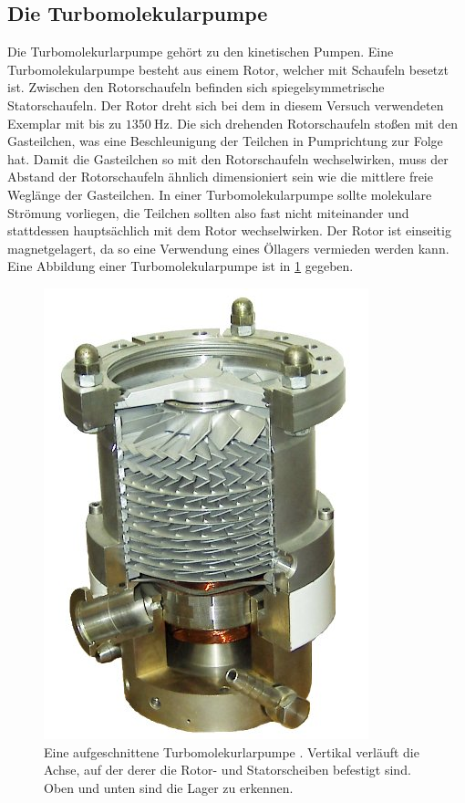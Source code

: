 \subsection{Die Turbomolekularpumpe}
Die Turbomolekurlarpumpe gehört zu den kinetischen Pumpen. Eine Turbomolekularpumpe besteht
aus einem Rotor, welcher mit Schaufeln besetzt ist. Zwischen den Rotorschaufeln befinden sich
spiegelsymmetrische Statorschaufeln. Der Rotor dreht sich bei dem in diesem Versuch verwendeten
Exemplar mit bis zu $\SI{1350}{\hertz}$. Die sich drehenden Rotorschaufeln stoßen mit den Gasteilchen,
was eine Beschleunigung der Teilchen in Pumprichtung zur Folge hat. Damit die Gasteilchen so mit den Rotorschaufeln wechselwirken,
muss der Abstand der Rotorschaufeln ähnlich dimensioniert sein wie die mittlere freie Weglänge der
Gasteilchen. In einer Turbomolekularpumpe sollte molekulare Strömung vorliegen, die Teilchen
sollten also fast nicht miteinander und stattdessen hauptsächlich mit dem Rotor wechselwirken.
Der Rotor ist einseitig magnetgelagert, da so eine Verwendung eines Öllagers vermieden werden kann.
Eine Abbildung einer Turbomolekularpumpe ist in \ref{fig:turbomolekular} gegeben.
\begin{figure}
 \centering
 \caption{Eine aufgeschnittene Turbomolekurlarpumpe \cite{turbopumpenbild}. Vertikal verläuft die Achse, auf der derer die Rotor- und Statorscheiben
 befestigt sind. Oben und unten sind die Lager zu erkennen.}
 \label{fig:turbomolekular}
 \includegraphics[scale=0.3]{pictures/Cut_through_turbomolecular_pump.jpg}
\end{figure}
\noindent

